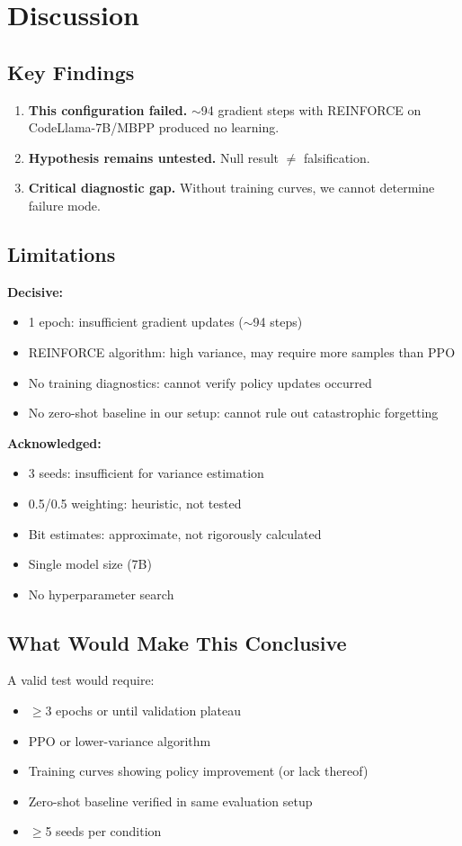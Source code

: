 \section{Discussion}
\label{sec:discussion}

\subsection{Key Findings}

\begin{enumerate}
    \item \textbf{This configuration failed.} $\sim$94 gradient steps with REINFORCE on CodeLlama-7B/MBPP produced no learning.
    \item \textbf{Hypothesis remains untested.} Null result $\neq$ falsification.
    \item \textbf{Critical diagnostic gap.} Without training curves, we cannot determine failure mode.
\end{enumerate}

\subsection{Limitations}

\textbf{Decisive:}
\begin{itemize}
    \item 1 epoch: insufficient gradient updates ($\sim$94 steps)
    \item REINFORCE algorithm: high variance, may require more samples than PPO
    \item No training diagnostics: cannot verify policy updates occurred
    \item No zero-shot baseline in our setup: cannot rule out catastrophic forgetting
\end{itemize}

\textbf{Acknowledged:}
\begin{itemize}
    \item 3 seeds: insufficient for variance estimation
    \item 0.5/0.5 weighting: heuristic, not tested
    \item Bit estimates: approximate, not rigorously calculated
    \item Single model size (7B)
    \item No hyperparameter search
\end{itemize}

\subsection{What Would Make This Conclusive}

A valid test would require:
\begin{itemize}
    \item $\geq$3 epochs or until validation plateau
    \item PPO or lower-variance algorithm
    \item Training curves showing policy improvement (or lack thereof)
    \item Zero-shot baseline verified in same evaluation setup
    \item $\geq$5 seeds per condition
\end{itemize}
